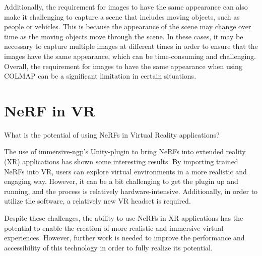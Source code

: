 Additionally, the requirement for images to have the same appearance can also make it challenging to capture a scene that includes moving objects, such as people or vehicles. This is because the appearance of the scene may change over time as the moving objects move through the scene. In these cases, it may be necessary to capture multiple images at different times in order to ensure that the images have the same appearance, which can be time-consuming and challenging. Overall, the requirement for images to have the same appearance when using COLMAP can be a significant limitation in certain situations.


\section{NeRF in VR}
\begin{description}[leftmargin=!,labelwidth=\widthof{RQ 1:}]
\item[\textbf{RQ 4:}]
What is the potential of using NeRFs in Virtual Reality applications?
\end{description}

The use of immersive-ngp's Unity-plugin to bring NeRFs into extended reality (XR) applications has shown some interesting results. By importing trained NeRFs into VR, users can explore virtual environments in a more realistic and engaging way. However, it can be a bit challenging to get the plugin up and running, and the process is relatively hardware-intensive. Additionally, in order to utilize the software, a relatively new VR headset is required.

Despite these challenges, the ability to use NeRFs in XR applications has the potential to enable the creation of more realistic and immersive virtual experiences. However, further work is needed to improve the performance and accessibility of this technology in order to fully realize its potential.